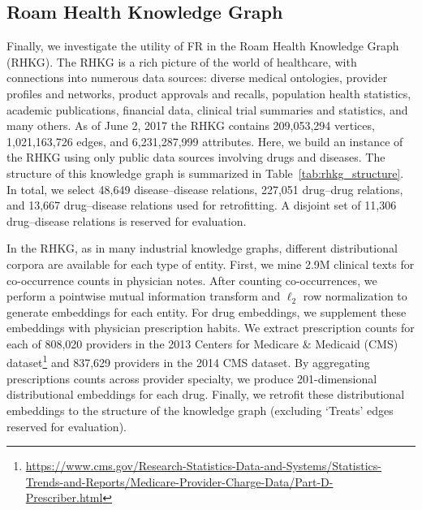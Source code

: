 \documentclass[11pt, a4paper]{article}
\begin{document}
\subsection{Roam Health Knowledge Graph}
Finally, we investigate the utility of FR in the Roam Health Knowledge Graph (RHKG). The RHKG is a rich picture of the world of healthcare, with connections into numerous data sources: diverse medical ontologies, provider profiles and networks, product approvals and recalls, population health statistics, academic publications, financial data, clinical trial summaries and statistics, and many others. As of June 2, 2017 the RHKG contains 209,053,294 vertices, 1,021,163,726 edges, and 6,231,287,999 attributes. Here, we build an instance of the RHKG using only public data sources involving drugs and diseases. The structure of this knowledge graph is summarized in Table~\ref{tab:rhkg_structure}. %
In total, we select 48,649 disease--disease relations, 227,051 drug--drug relations, and 13,667 drug--disease relations used for retrofitting. %
A disjoint set of 11,306 drug--disease relations is reserved for evaluation.%

In the RHKG, as in many industrial knowledge graphs, different distributional corpora are available for each type of entity. First, we mine 2.9M clinical texts for co-occurrence counts in physician notes. After counting co-occurrences, we perform a pointwise mutual information transform and $\ell_2$ row normalization to generate embeddings for each entity. For drug embeddings, we supplement these embeddings with physician prescription habits. We extract prescription counts for each of 808,020 providers in the 2013 Centers for Medicare \& Medicaid (CMS) dataset\footnote{\url{https://www.cms.gov/Research-Statistics-Data-and-Systems/Statistics-Trends-and-Reports/Medicare-Provider-Charge-Data/Part-D-Prescriber.html}} 
and 837,629 providers in the 2014 CMS dataset. By aggregating prescriptions counts across provider specialty, we produce 201-dimensional distributional embeddings for each drug. Finally, we retrofit these distributional embeddings to the structure of the knowledge graph (excluding `Treats' edges reserved for evaluation).
\end{document}
